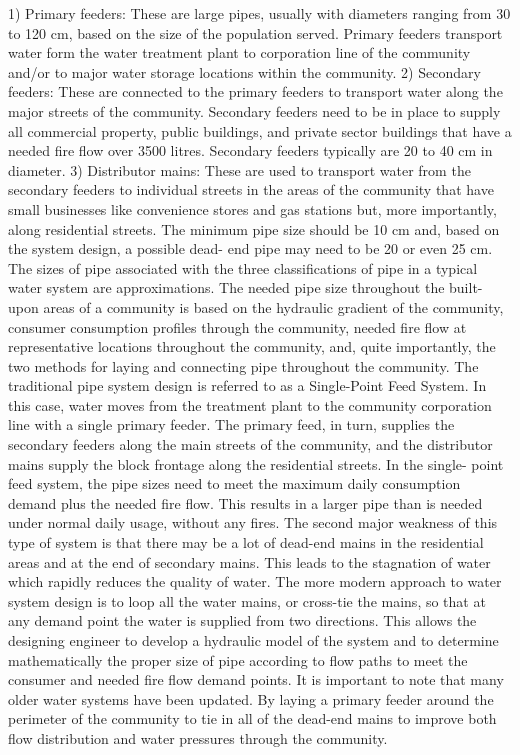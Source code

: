 1) Primary feeders: These are large pipes, usually with diameters ranging from 30 to 120 cm,
based on the size of the population served. Primary feeders transport water form the water 
treatment plant to corporation line of the community and/or to major water storage locations
within the community.
2) Secondary feeders: These are connected to the primary feeders to transport water along the 
major streets of the community. Secondary feeders need to be in place to supply all commercial 
property, public buildings, and private sector buildings that have a needed fire flow over 3500 
litres. Secondary feeders typically are 20 to 40 cm in diameter. 
3) Distributor mains: These are used to transport water from the secondary feeders to individual
streets in the areas of the community that have small businesses like convenience stores and gas 
stations but, more importantly, along residential streets. The minimum pipe size should be 10 cm
and, based on the system design, a possible dead- end pipe may need to be 20 or even 25 cm.
\bigbreak
The sizes of pipe associated with the three classifications of pipe in a typical water system are
approximations. The needed pipe size throughout the built-upon areas of a community is based on 
the hydraulic gradient of the community, consumer consumption profiles through the community, 
needed fire flow at representative locations throughout the community, and, quite importantly, 
the two methods for laying and connecting pipe throughout the community. The traditional pipe 
system design is referred to as a Single-Point Feed System. In this case, water moves from the 
treatment plant to the community corporation line with a single primary feeder. The primary feed,
in turn, supplies the secondary feeders along the main streets of the community, and the 
distributor mains supply the block frontage along the residential streets. In the single- point 
feed system, the pipe sizes need to meet the maximum daily consumption demand plus the needed 
fire flow. This results in a larger pipe than is needed under normal daily usage, without any 
fires. The second major weakness of this type of system is that there may be a lot of dead-end
mains in the residential areas and at the end of secondary mains. This leads to the stagnation 
of water which rapidly reduces the quality of water.
\bigbreak
The more modern approach to water system design is to loop all the water mains, or cross-tie the 
mains, so that at any demand point the water is supplied from two directions. This allows the 
designing engineer to develop a hydraulic model of the system and to determine mathematically 
the proper size of pipe according to flow paths to meet the consumer and needed fire flow demand 
points. It is important to note that many older water systems have been updated. By laying a 
primary feeder around the perimeter of the community to tie in all of the dead-end mains to 
improve both flow distribution and water pressures through the community.

\begin{figure}
    
\end{figure}








